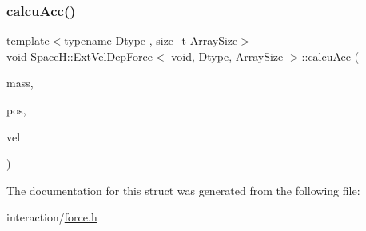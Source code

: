 \mbox{\label{struct_space_h_1_1_ext_vel_dep_force_3_01void_00_01_dtype_00_01_array_size_01_4_ab1ab7d0fa69ef28c8ec05ce5673d3373}} 
\subsubsection{\texorpdfstring{calcu\+Acc()}{calcuAcc()}}
{\footnotesize\ttfamily template$<$typename Dtype , size\+\_\+t Array\+Size$>$ \\
void \mbox{\hyperlink{struct_space_h_1_1_ext_vel_dep_force}{Space\+H\+::\+Ext\+Vel\+Dep\+Force}}$<$ void, Dtype, Array\+Size $>$\+::calcu\+Acc (\begin{DoxyParamCaption}\item[{const \mbox{\hyperlink{struct_space_h_1_1_ext_vel_dep_force_3_01void_00_01_dtype_00_01_array_size_01_4_aff7fedbfa20cab198234cc35a922fa1f}{Scalar\+Array}} \&}]{mass,  }\item[{const \mbox{\hyperlink{struct_space_h_1_1_ext_vel_dep_force_3_01void_00_01_dtype_00_01_array_size_01_4_a606b1df4989b62f06775a825c0f8e483}{Vector\+Array}} \&}]{pos,  }\item[{const \mbox{\hyperlink{struct_space_h_1_1_ext_vel_dep_force_3_01void_00_01_dtype_00_01_array_size_01_4_a606b1df4989b62f06775a825c0f8e483}{Vector\+Array}} \&}]{vel }\end{DoxyParamCaption})\hspace{0.3cm}{\ttfamily [inline]}}



The documentation for this struct was generated from the following file\+:\begin{DoxyCompactItemize}
\item 
interaction/\mbox{\hyperlink{force_8h}{force.\+h}}\end{DoxyCompactItemize}
